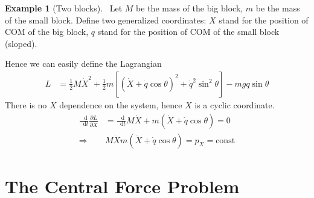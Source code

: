 \documentclass[twoside,9pt]{article}
\numberwithin{equation}{section} %
\newcommand{\lms}{\fontfamily{lmss}\selectfont} %
\renewcommand*\d{\mathop{}\!\mathrm{d}}
\theoremstyle{definition}
\newtheorem{example}{\lms Example}[section]
\theoremstyle{remark}
\begin{document}
\begin{example}[Two blocks]\
Let $M$ be the mass of the big block,
$m$ be the mass of the small block.
Define two generalized coordinates:
$X$ stand for the position of COM of the big block,
$q$ stand for the position of COM of the small block
(sloped). 
\tikzexternalenable
\begin{figure}[H]
    \centering
\end{figure}
\tikzexternaldisable
Hence we can easily define the Lagrangian
\begin{align*}
    L &= 
    \frac{1}{2}M\dot{X}^2
    + \frac{1}{2}m[
        (\dot{X} + \dot{q}\cos\theta)^2
        + \dot{q}^2\sin^2\theta
    ] - mgq\sin\theta
\end{align*}
There is no $X$ dependence on the system, hence
$X$ is a cyclic coordinate.
\begin{align*}
    \frac{\d}{\d t}\frac{\partial L}{\partial\dot{X}}
    &= \frac{\d}{\d t}M\dot{X} + m(\dot{X} + \dot{q}\cos\theta) = 0\\
    \Rightarrow &M\dot{X} m(\dot{X} +\dot{q}\cos\theta) = p_X = \text{const}
\end{align*}
\end{example}


\newpage
\section{The Central Force Problem}
\end{document}
